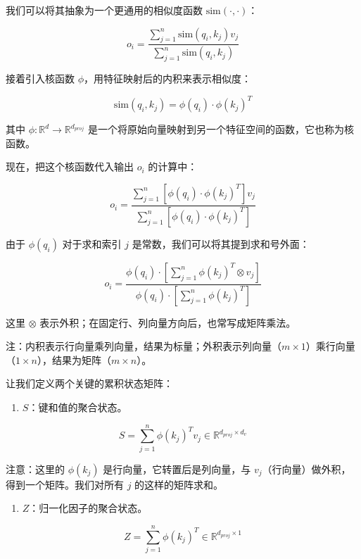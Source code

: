 我们可以将其抽象为一个更通用的相似度函数 \(\mathrm{sim}(\cdot,\cdot)\)：

\[
o_i =
\frac{
\sum_{j=1}^{n} \mathrm{sim}(q_i,k_j)v_j
}{
\sum_{j=1}^{n} \mathrm{sim}(q_i,k_j)
}
\]

接着引入核函数 \(\phi\)，用特征映射后的内积来表示相似度：

\[
\mathrm{sim}(q_i,k_j) = \phi(q_i)\cdot\phi(k_j)^T
\]

其中 \(\phi:\mathbb{R}^{d}\rightarrow\mathbb{R}^{d_{proj}}\) 是一个将原始向量映射到另一个特征空间的函数，它也称为核函数。

现在，把这个核函数代入输出 \(o_i\) 的计算中：

\[
o_i =
\frac{
\sum_{j=1}^{n}[\phi(q_i)\cdot\phi(k_j)^T]v_j
}{
\sum_{j=1}^{n}[\phi(q_i)\cdot\phi(k_j)^T]
}
\]

由于 \(\phi(q_i)\) 对于求和索引 \(j\) 是常数，我们可以将其提到求和号外面：

\[
o_i =
\frac{
\phi(q_i)\cdot\left[\sum_{j=1}^{n}\phi(k_j)^T \otimes v_j\right]
}{
\phi(q_i)\cdot\left[\sum_{j=1}^{n}\phi(k_j)^T\right]
}
\]

这里 \(\otimes\) 表示外积；在固定行、列向量方向后，也常写成矩阵乘法。

注：内积表示行向量乘列向量，结果为标量；外积表示列向量（\(m \times 1\)）乘行向量（\(1 \times n\)），结果为矩阵（\(m \times n\)）。

让我们定义两个关键的累积状态矩阵：

\begin{enumerate}
\def\labelenumi{\arabic{enumi}.}
\tightlist
\item
  \(S\)：键和值的聚合状态。
\end{enumerate}

\[
S = \sum_{j=1}^{n}\phi(k_j)^T v_j \in \mathbb{R}^{d_{proj}\times d_v}
\]

注意：这里的 \(\phi(k_j)\) 是行向量，它转置后是列向量，与 \(v_j\)（行向量）做外积，得到一个矩阵。我们对所有 \(j\) 的这样的矩阵求和。

\begin{enumerate}
\def\labelenumi{\arabic{enumi}.}
\setcounter{enumi}{1}
\tightlist
\item
  \(Z\)：归一化因子的聚合状态。
\end{enumerate}

\[
Z = \sum_{j=1}^{n}\phi(k_j)^T \in \mathbb{R}^{d_{proj}\times 1}
\]

